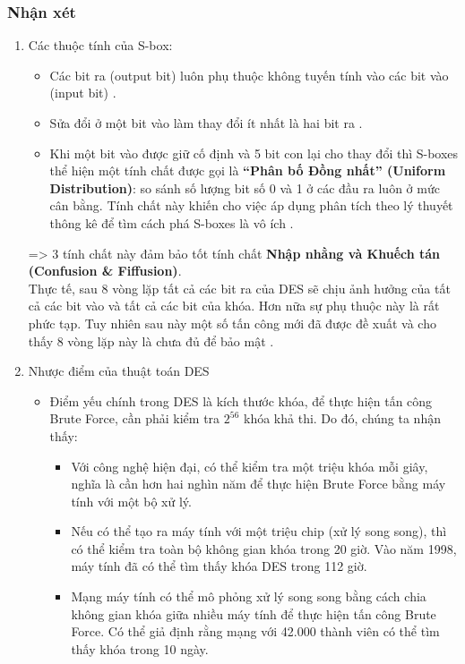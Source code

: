 \subsubsection{Nhận xét}
\begin{enumerate}
    \item Các thuộc tính của S-box:
    \begin{itemize}
    \item Các bit ra (output bit) luôn phụ thuộc không tuyến tính vào các bit vào (input bit) \cite{Khanh2014}.
    \item Sửa đổi ở một bit vào làm thay đổi ít nhất là hai bit ra \cite{Khanh2014}.
    \item Khi một bit vào được giữ cố định và 5 bit con lại cho thay đổi thì S-boxes thể hiện một tính chất được gọi là \textbf{“Phân bố Đồng nhất” (Uniform Distribution)}: so sánh số lượng bit số 0 và 1 ở các đầu ra luôn ở mức cân bằng. Tính chất này khiến cho việc áp dụng phân tích theo lý thuyết thông kê để tìm cách phá S-boxes là vô ích \cite{Khanh2014}.
    \end{itemize}
    => 3 tính chất này đảm bảo tốt tính chất \textbf{Nhập nhằng và Khuếch tán (Confusion \& Fiffusion)}.\\
    Thực tế, sau 8 vòng lặp tất cả các bit ra của DES sẽ chịu ảnh hưởng của tất cả các bit vào và tất cả các bit của khóa. Hơn nữa sự phụ thuộc này là rất phức tạp. Tuy nhiên sau này một số tấn công mới đã được đề xuất và cho thấy 8 vòng lặp này là chưa đủ để bảo mật \cite{Khanh2014}.
    \item Nhược điểm của thuật toán DES
    \begin{itemize}
    \item Điểm yếu chính trong DES là kích thước khóa, để thực hiện tấn công Brute Force, cần phải kiểm tra  $2^{56}$ khóa khả thi. Do đó, chúng ta nhận thấy:
    \begin{itemize}
        \item Với công nghệ hiện đại, có thể kiểm tra một triệu khóa mỗi giây, nghĩa là cần hơn hai nghìn năm để thực hiện Brute Force bằng máy tính với một bộ xử lý.
        \item Nếu có thể tạo ra máy tính với một triệu chip (xử lý song song), thì có thể kiểm tra toàn bộ không gian khóa trong 20 giờ. Vào năm 1998, máy tính đã có thể tìm thấy khóa DES trong 112 giờ.
        \item Mạng máy tính có thể mô phỏng xử lý song song bằng cách chia không gian khóa giữa nhiều máy tính để thực hiện tấn công Brute Force. Có thể giả định rằng mạng với 42.000 thành viên có thể tìm thấy khóa trong 10 ngày.

\end{itemize}
\end{itemize}
\end{enumerate}
